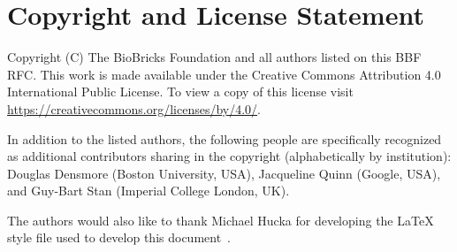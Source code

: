 \section{Copyright and License Statement}


Copyright (C) The BioBricks Foundation and all authors listed on this BBF RFC. This work is made available under the Creative Commons Attribution 4.0 International Public License. To view a copy of this license visit \href{https://creativecommons.org/licenses/by/4.0/}{https://creativecommons.org/licenses/by/4.0/}.

In addition to the listed authors, the following people are specifically recognized as additional contributors sharing in the copyright (alphabetically by institution):
Douglas Densmore (Boston University, USA), 
Jacqueline Quinn (Google, USA), and
Guy-Bart Stan (Imperial College London, UK).

The authors would also like to thank Michael Hucka for developing the LaTeX style file used to develop this document~\citep{hucka2017sbmlpkgspec}.
